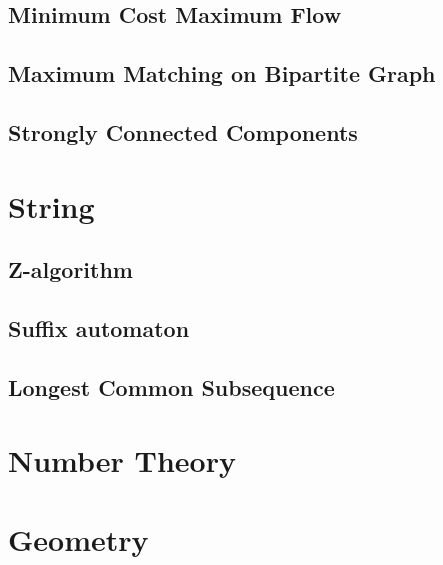 \documentclass[a4paper,11pt]{article}
\begin{document}
  \subsection{Minimum Cost Maximum Flow}
    
  	
  \subsection{Maximum Matching on Bipartite Graph}
    
  
  \subsection{Strongly Connected Components}
    

\section{String}
  \subsection{Z-algorithm}
      

  \subsection{Suffix automaton}
      
  
  \subsection{Longest Common Subsequence}
    

\section{Number Theory}
  

\section{Geometry}
  
\end{document}
